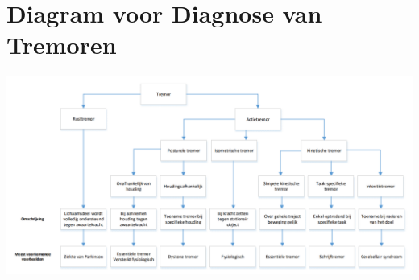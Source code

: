 \appendix
\section{Diagram voor Diagnose van Tremoren}
\label{appendix:diagnose}

\includegraphics[width=\textwidth]{graphics/graph-tremor-diagnosis.png}